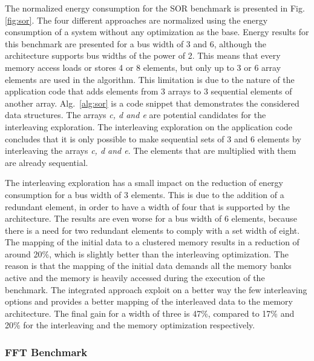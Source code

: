 \documentclass[prodmode,acmtecs]{acmsmall}
\begin{document}
The normalized energy consumption for the SOR benchmark is presented in Fig.\ref{fig:sor}.
The four different approaches are normalized using the energy consumption of a system without any optimization as the base.
Energy results for this benchmark are presented for a bus width of 3 and 6, although the architecture supports bus widths of the power of 2.
This means that every memory access loads or stores 4 or 8 elements, but only up to 3 or 6 array elements are used in the algorithm.
This limitation is due to the nature of the application code that adds elements from 3 arrays to 3 sequential elements of another array. 
Alg.~\ref{alg:sor} is a code snippet that demonstrates the considered data structures.
The arrays \textit{c, d and e} are potential candidates for the interleaving exploration.
The interleaving exploration on the application code concludes that it is only possible to make sequential sets of 3 and 6 elements by interleaving the arrays \textit{c, d and e}.
The elements that are multiplied with them are already sequential.

 The interleaving exploration has a small impact on the reduction of energy consumption for a bus width of 3 elements.
 This is due to the addition of a redundant element, in order to have a width of four that is supported by the architecture.
The results are even worse for a bus width of 6 elements, because there is a need for two redundant elements to comply with a set width of eight.
The mapping of the initial data to a clustered memory results in a reduction of around 20\%, which is slightly better than the interleaving optimization.
The reason is that the mapping of the initial data demands all the memory banks active and the memory is heavily accessed during the execution of the benchmark.
The integrated approach exploit on a better way the few interleaving options and provides a better mapping of the interleaved data to the memory architecture.
The final gain for a width of three is 47\%, compared to 17\% and 20\% for the interleaving and the memory optimization respectively.

\subsubsection{FFT Benchmark}
\end{document}
